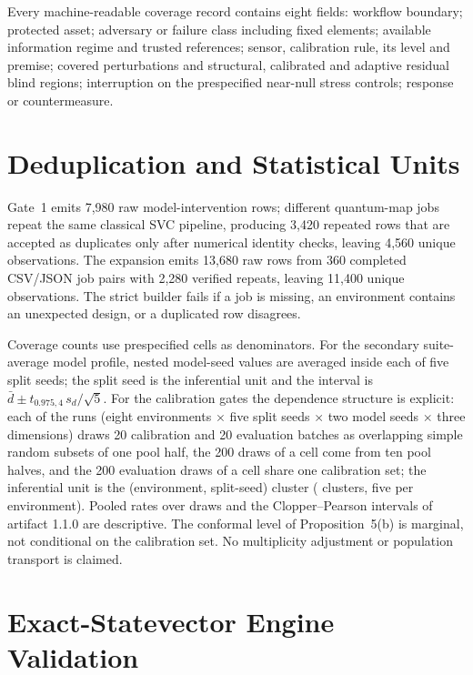 \documentclass[10pt,journal,compsoc]{IEEEtran}
\begin{document}
Every machine-readable coverage record contains eight fields: workflow
boundary; protected asset; adversary or failure class including fixed
elements; available information regime and trusted references; sensor,
calibration rule, its level and premise; covered perturbations and
structural, calibrated and adaptive residual blind regions; interruption on
the prespecified near-null stress controls; response or countermeasure.

\section{Deduplication and Statistical Units}

Gate~1 emits 7,980 raw model-intervention rows; different quantum-map jobs
repeat the same classical SVC pipeline, producing 3,420 repeated rows that are
accepted as duplicates only after numerical identity checks, leaving 4,560
unique observations. The expansion emits 13,680 raw rows from 360 completed
CSV/JSON job pairs with 2,280 verified repeats, leaving 11,400 unique
observations. The strict builder fails if a job is missing, an environment
contains an unexpected design, or a duplicated row disagrees.

Coverage counts use prespecified cells as denominators. For the secondary
suite-average model profile, nested model-seed values are averaged inside each
of five split seeds; the split seed is the inferential unit and the interval
is $\bar d\pm t_{0.975,4}\,s_d/\sqrt5$. For the calibration gates the
dependence structure is explicit: each of the \NRuns{} runs (eight
environments $\times$ five split seeds $\times$ two model seeds $\times$
three dimensions) draws 20 calibration and 20 evaluation batches as
overlapping simple random subsets of one pool half, the 200 draws of a cell
come from ten pool halves, and the 200 evaluation draws of a cell share one
calibration set; the inferential unit is the (environment, split-seed)
cluster (\NClusters{} clusters, five per environment). Pooled rates over
draws and the Clopper--Pearson intervals of artifact 1.1.0 are descriptive.
The conformal level of Proposition~5(b) is marginal, not conditional on the
calibration set. No multiplicity adjustment or population transport is
claimed.

\section{Exact-Statevector Engine Validation}
\end{document}
